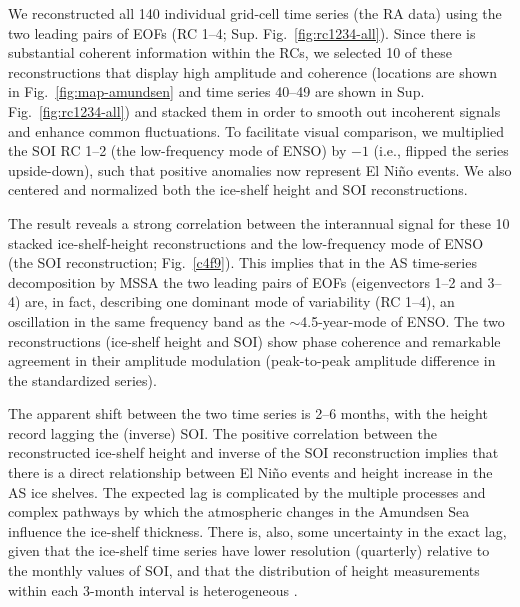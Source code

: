 We reconstructed all 140 individual grid-cell time series (the RA data) using the two leading pairs of EOFs (RC 1--4; Sup. Fig.~\ref{fig:rc1234-all}). Since there is substantial coherent information within the RCs, we selected 10 of these reconstructions that display high amplitude and coherence (locations are shown in Fig.~\ref{fig:map-amundsen} and time series 40--49 are shown in Sup. Fig.~\ref{fig:rc1234-all}) and stacked them in order to smooth out incoherent signals and enhance common fluctuations. To facilitate visual comparison, we multiplied the SOI RC 1--2 (the low-frequency mode of ENSO) by $-1$ (i.e., flipped the series upside-down), such that positive anomalies now represent El Ni\~no events. We also centered and normalized both the ice-shelf height and SOI reconstructions.

The result reveals a strong correlation between the interannual signal for these 10 stacked ice-shelf-height reconstructions and the low-frequency mode of ENSO (the SOI reconstruction; Fig.~\ref{c4f9}). This implies that in the AS time-series decomposition by MSSA the two leading pairs of EOFs (eigenvectors 1--2 and 3--4) are, in fact, describing one dominant mode of variability (RC 1--4), an oscillation in the same frequency band as the $\sim$4.5-year-mode of ENSO. The two reconstructions (ice-shelf height and SOI) show phase coherence and remarkable agreement in their amplitude modulation (peak-to-peak amplitude difference in the standardized series).

The apparent shift between the two time series is 2--6 months, with the height record lagging the (inverse) SOI. The positive correlation between the reconstructed ice-shelf height and inverse of the SOI reconstruction implies that there is a direct relationship between El Ni\~no events and height increase in the AS ice shelves. The expected lag is complicated by the multiple processes and complex pathways by which the atmospheric changes in the Amundsen Sea influence the ice-shelf thickness. There is, also, some uncertainty in the exact lag, given that the ice-shelf time series have lower resolution (quarterly) relative to the monthly values of SOI, and that the distribution of height measurements within each 3-month interval is heterogeneous \parencite{Paolo2015a}. 


